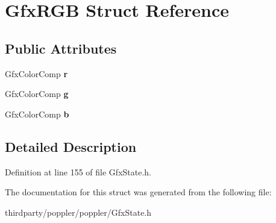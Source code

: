 \hypertarget{struct_gfx_r_g_b}{}\section{Gfx\+R\+GB Struct Reference}
\label{struct_gfx_r_g_b}
\subsection*{Public Attributes}
\begin{DoxyCompactItemize}
\item 
\mbox{\label{struct_gfx_r_g_b_a35515381e6e23ee5f86017381ff522ea}} 
Gfx\+Color\+Comp {\bfseries r}
\item 
\mbox{\label{struct_gfx_r_g_b_a2c18b64ceacee77f7b868df36732fb9a}} 
Gfx\+Color\+Comp {\bfseries g}
\item 
\mbox{\label{struct_gfx_r_g_b_a478e4ff58ceafc3b9c80e670e49d6b63}} 
Gfx\+Color\+Comp {\bfseries b}
\end{DoxyCompactItemize}


\subsection{Detailed Description}


Definition at line 155 of file Gfx\+State.\+h.



The documentation for this struct was generated from the following file\+:\begin{DoxyCompactItemize}
\item 
thirdparty/poppler/poppler/Gfx\+State.\+h\end{DoxyCompactItemize}
